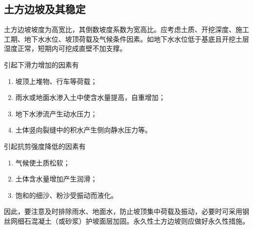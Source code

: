 \documentclass{book}
\begin{document}
\subsection{土方边坡及其稳定}
\par 土方边坡坡度为高宽比，其倒数坡度系数为宽高比。应考虑土质、开挖深度、施工工期、地下水水位、坡顶荷载及气候条件因素。如地下水水位低于基底且开挖土层湿度正常，短期内可挖成直壁不加支撑。
\par 引起下滑力增加的因素有
\begin{enumerate}
    \item 坡顶上堆物、行车等荷载；
    \item 雨水或地面水渗入土中使含水量提高，自重增加；
    \item 地下水渗流产生动水压力；
    \item 土体竖向裂缝中的积水产生侧向静水压力等。
\end{enumerate}
\par 引起抗剪强度降低的因素有
\begin{enumerate}
    \item 气候使土质松软；
    \item 土体含水量增加产生润滑；
    \item 饱和的细沙、粉沙受振动而液化。
\end{enumerate}
\par 因此，要注意及时排除雨水、地面水，防止坡顶集中荷载及振动，必要时可采用钢丝网细石混凝土（或砂浆）护坡面层加固。永久性土方边坡则应做好永久性措施。
\end{document}
